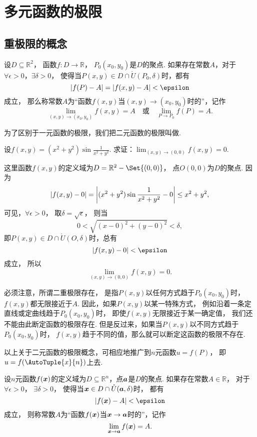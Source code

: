 \section{多元函数的极限}
\subsection{重极限的概念}
\begin{definition}
设\(D\subseteq\mathbb{R}^2\)，
函数\(f\colon D\to\mathbb{R}\)，
\(P_0(x_0,y_0)\)是\(D\)的聚点.
如果存在常数\(A\)，对于\(\forall \epsilon > 0\)，\(\exists \delta > 0\)，
使得当\(P(x,y) \in D \cap \mathring{U}(P_0,\delta)\)时，都有\[
	\abs{f(P)-A} = \abs{f(x,y)-A} < \epsilon
\]成立，
那么称常数\(A\)为“函数\(f(x,y)\)当\((x,y)\to(x_0,y_0)\)时的”，记作\[
	\lim_{(x,y)\to(x_0,y_0)} f(x,y) = A
	\quad\text{或}\quad
	\lim_{P \to P_0} f(P) = A.
\]

为了区别于一元函数的极限，我们把二元函数的极限叫做.
\end{definition}

\begin{example}
设\(f(x,y) = (x^2+y^2) \sin\frac1{x^2+y^2}\).
求证：\(\lim_{(x,y)\to(0,0)} f(x,y) = 0\).
\begin{solution}
这里函数\(f(x,y)\)的定义域为\(D = \mathbb{R}^2 - \Set{(0,0)}\)，
点\(O(0,0)\)为\(D\)的聚点.
因为\[
	\abs{f(x,y)-0}
	= \abs{(x^2+y^2) \sin\frac1{x^2+y^2} - 0}
	\leq x^2+y^2,
\]
可见，\(\forall\epsilon>0\)，
取\(\delta=\sqrt{\epsilon}\)，
则当\[
	0 < \sqrt{(x-0)^2+(y-0)^2} < \delta,
\]
即\(P(x,y) \in D \cap \mathring{U}(O,\delta)\)时，总有\[
	\abs{f(x,y)-0} < \epsilon
\]成立，
所以\[
	\lim_{(x,y)\to(0,0)} f(x,y) = 0.
\]
\end{solution}
\end{example}

必须注意，所谓二重极限存在，
是指\(P(x,y)\)以任何方式趋于\(P_0(x_0,y_0)\)时，\(f(x,y)\)都无限接近于\(A\).
因此，如果\(P(x,y)\)以某一特殊方式，
例如沿着一条定直线或定曲线趋于\(P_0(x_0,y_0)\)时，
即使\(f(x,y)\)无限接近于某一确定值，
我们还不能由此断定函数的极限存在.
但是反过来，如果当\(P(x,y)\)以不同方式趋于\(P_0(x_0,y_0)\)时，
\(f(x,y)\)趋于不同的值，那么就可以断定这函数的极限不存在.

以上关于二元函数的极限概念，可相应地推广到\(n\)元函数\(u = f(P)\)，
即\(u = f(\AutoTuple{x}{n})\)上去.
\begin{definition}
设\(n\)元函数\(f(\boldsymbol{x})\)的定义域为\(D \subseteq \mathbb{R}^n\)，点\(\boldsymbol{a}\)是\(D\)的聚点.
如果存在常数\(A \in \mathbb{R}\)，
对于\(\forall\epsilon>0\)，
\(\exists\delta>0\)，
使得当\(\boldsymbol{x} \in D \cap \mathring{U}(\boldsymbol{a},\delta)\)时，
都有\[
	\abs{f(\vb{x}) - A} < \epsilon
\]成立，
则称常数\(A\)为“函数\(f(\boldsymbol{x})\)当\(\boldsymbol{x}\to\boldsymbol{a}\)时的”，记作\[
	\lim_{\boldsymbol{x}\to\boldsymbol{a}} f(\boldsymbol{x}) = A.
\]
\end{definition}

